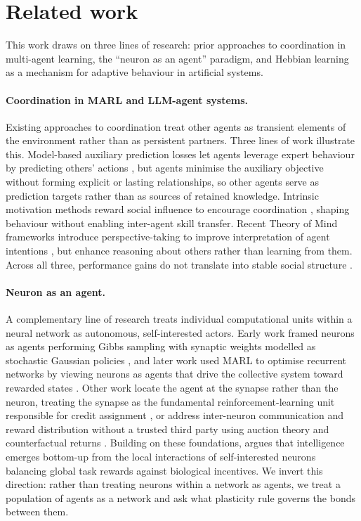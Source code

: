 \section{Related work}
\label{related}

This work draws on three lines of research: prior approaches to coordination in multi-agent learning, the ``neuron as an agent'' paradigm, and Hebbian learning as a mechanism for adaptive behaviour in artificial systems.

\paragraph{Coordination in MARL and LLM-agent systems.} Existing approaches to coordination treat other agents as transient elements of the environment rather than as persistent partners. Three lines of work illustrate this. Model-based auxiliary prediction losses let agents leverage expert behaviour by predicting others' actions \cite{ndousse2021emergent}, but agents minimise the auxiliary objective without forming explicit or lasting relationships, so other agents serve as prediction targets rather than as sources of retained knowledge. Intrinsic motivation methods reward social influence to encourage coordination \cite{jaques2019social}, shaping behaviour without enabling inter-agent skill transfer. Recent Theory of Mind frameworks introduce perspective-taking to improve interpretation of agent intentions \cite{licua2025mindforge}, but enhance reasoning about others rather than learning from them. Across all three, performance gains do not translate into stable social structure \cite{ye2025efficient}.

\paragraph{Neuron as an agent.} A complementary line of research treats individual computational units within a neural network as autonomous, self-interested actors. Early work framed neurons as agents performing Gibbs sampling with synaptic weights modelled as stochastic Gaussian policies \cite{wang2015reinforcement}, and later work used MARL to optimise recurrent networks by viewing neurons as agents that drive the collective system toward rewarded states \cite{chalk2019training}. Other work locate the agent at the synapse rather than the neuron, treating the synapse as the fundamental reinforcement-learning unit responsible for credit assignment \cite{bhargava2022gradient}, or address inter-neuron communication and reward distribution without a trusted third party using auction theory and counterfactual returns \cite{ohsawa2018neuron}. Building on these foundations, \cite{ott2020giving} argues that intelligence emerges bottom-up from the local interactions of self-interested neurons balancing global task rewards against biological incentives. We invert this direction: rather than treating neurons within a network as agents, we treat a population of agents as a network and ask what plasticity rule governs the bonds between them.

